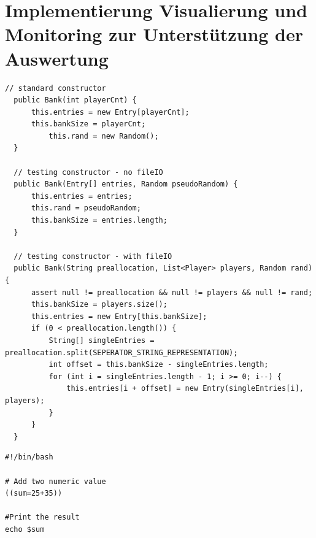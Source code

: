 %   
   
  


\section{Implementierung Visualierung und Monitoring zur Unterst\"utzung der Auswertung}


\begin{lstlisting}[style=javaStyle]
  // standard constructor 
  public Bank(int playerCnt) {
      this.entries = new Entry[playerCnt];
      this.bankSize = playerCnt;
          this.rand = new Random();
  }
  
  // testing constructor - no fileIO
  public Bank(Entry[] entries, Random pseudoRandom) {
      this.entries = entries;
      this.rand = pseudoRandom;
      this.bankSize = entries.length;
  }
  
  // testing constructor - with fileIO
  public Bank(String preallocation, List<Player> players, Random rand) {
      assert null != preallocation && null != players && null != rand;
      this.bankSize = players.size();
      this.entries = new Entry[this.bankSize];
      if (0 < preallocation.length()) {
          String[] singleEntries = preallocation.split(SEPERATOR_STRING_REPRESENTATION);
          int offset = this.bankSize - singleEntries.length;
          for (int i = singleEntries.length - 1; i >= 0; i--) {
              this.entries[i + offset] = new Entry(singleEntries[i], players);
          }
      }
  }
\end{lstlisting}


\begin{lstlisting}[style=bashStyle]
#!/bin/bash

# Add two numeric value
((sum=25+35))

#Print the result
echo $sum
\end{lstlisting}


